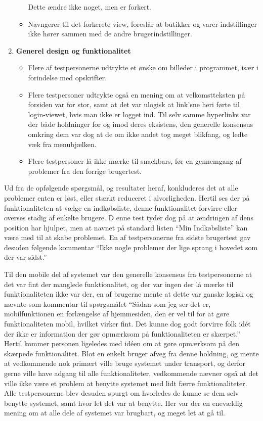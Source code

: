\begin{enumerate}
\begin{itemize}
      Dette ændre ikke noget, men er forkert.
      \item Navngerer til det forkerete view, foreslår at butikker og varer-indstillinger ikke hører sammen med de andre brugerindstillinger.
   \end{itemize}
   \item \textbf{Generel design og funktionalitet}
   \begin{itemize}
      \item Flere af testpersonerne udtrykte et ønske om billeder i programmet, især i forindelse med opskrifter.
      \item Flere testpersoner udtrykte også en mening om at velkomstteksten på forsiden var for stor, samt at det var ulogisk at link'sne heri førte til login-viewet, hvis man ikke er logget ind.
      Til selv samme hyperlinks var der både holdninger for og imod deres eksistens, den generelle konsensus omkring dem var dog at de om ikke andet tog meget blikfang, og ledte væk fra menubjælken.
      \item Flere testpersoner lå ikke mærke til snackbars, før en gennemgang af problemer fra den forrige brugertest.
   \end{itemize}
\end{enumerate}

Ud fra de opfølgende spørgsmål, og resultater heraf, konkluderes det at alle problemer enten er løst, eller stærkt reduceret i alvorligheden.
Hertil ses der på funktionaliteten at vælge en indkøbsliste, denne funktionalitet forvirre eller overses stadig af enkelte brugere. D
enne test tyder dog på at ændringen af dens position har hjulpet, men at navnet på standard listen ``Min Indkøbsliste'' kan være med til at skabe problemet.
En af testpersonerne fra sidste brugertest gav desuden følgende kommentar ``Ikke nogle problemer der lige sprang i hovedet som der var sidst.''

Til den mobile del af systemet var den generelle konsensus fra testpersonerne at det var fint der manglede funktionalitet, og der var ingen der lå mærke til funktionaliteten ikke var der, en af brugerne mente at dette var ganske logisk og nævnte som kommentar til spørgsmålet ``Sådan som jeg ser det er, mobilfunktionen en forlængelse af hjemmesiden, den er vel til for at gøre funktionaliteten mobil, hvilket virker fint. Det kunne dog godt forvirre folk idét der ikke er information der gør opmærksom på funktionaliteten er skærpet.''
Hertil kommer personen ligeledes med idéen om at gøre opmærksom på den skærpede funktionalitet.
Blot en enkelt bruger afveg fra denne holdning, og mente at vedkommende nok primært ville bruge systemet under transport, og derfor gerne ville have adgang til alle funktionaliteter, vedkommende nævner også at det ville ikke være et problem at benytte systemet med lidt færre funktionaliteter.
Alle testpersonerne blev desuden spurgt om hvorledes de kunne se dem selv benytte systemet, samt hvor let det var at benytte.
Her var der en enevældig mening om at alle dele af systemet var brugbart, og meget let at gå til.